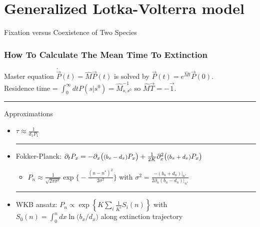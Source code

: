 \documentclass{beamer}
\begin{document}
\section[Fixation]{Generalized Lotka-Volterra model}

\begin{frame}
\centering
{{\Huge Fixation versus Coexistence of Two Species}}
\end{frame}


\begin{frame}
\frametitle{How To Calculate The Mean Time To Extinction}
Master equation $\dot{\vec{P}}(t) = \hat{M}\vec{P}(t)$ is solved by $\vec{P}(t)=e^{\hat{M}t}\vec{P}(0)$. \\ %
\pause
\large{
Residence time = $\int_0^{\infty} dt P(s|s^0)=\hat{M}^{-1}_{s,s^0}$ so $\boxed{\hat{M}\vec{T}=-\vec{1}}$. \\%
}
\pause
\noindent\rule{10cm}{0.4pt}
\large{Approximations}
\begin{itemize}
	\item $\tau \approx \frac{1}{d_1 P_1}$
	\pause
	\\ \noindent\rule{3cm}{0.4pt}
	\item Fokker-Planck: $\partial_t P_x = - \partial_x\big(\text{\footnotesize{$(b_x - d_x)$}} P_x \big) + \frac{1}{2 K} \partial_x^2 \big(\text{\footnotesize{$(b_x + d_x)$}} P_x \big)$
	\begin{itemize}
		\item $P_n \approx \frac{1}{\sqrt{2\pi\sigma^{2}}}\exp\Big\lbrace-\frac{(n-n^*)^2}{2\sigma^{2}}\Big\rbrace$ with $\sigma^2=\frac{-(b_n + d_n)|_{n^*}}{2\partial_n(b_n - d_n)|_{n^*}}$
	\end{itemize}
	\pause
	\noindent\rule{9cm}{0.4pt}
	\item WKB ansatz: $P_n \propto \exp \left\{ K \sum_i \frac{1}{K^i}S_i(n) \right\}$ with\\
	$S_0(n) = \int_{0}^{n} dx \ln\big(b_x/d_x\big)$ along extinction trajectory
\end{itemize}
\end{frame}
\end{document}

